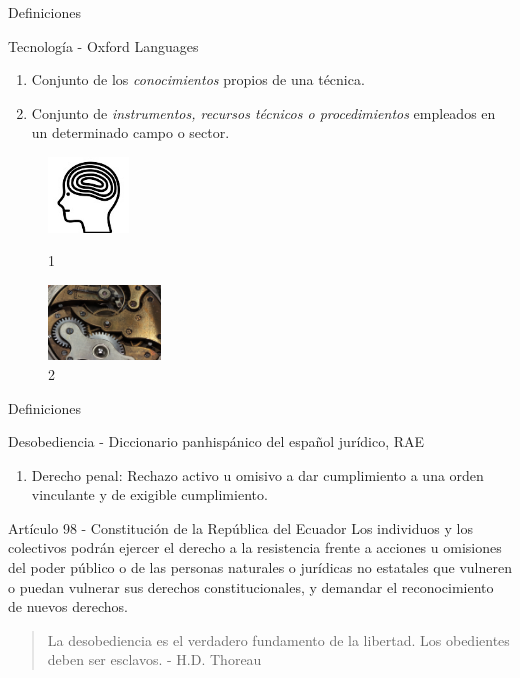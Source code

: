 \documentclass[spanish]{beamer}
\begin{document}
\begin{frame}{Definiciones}
    \begin{block}{Tecnología - Oxford Languages}
        \begin{enumerate}
            \item Conjunto de los \emph{conocimientos} propios de una técnica.
            \item Conjunto de \emph{instrumentos, recursos técnicos o procedimientos} empleados en un determinado campo o sector.
        \end{enumerate}                             
    \end{block}
    \begin{figure}[htb!]        
            \hspace*{1.5cm}\includegraphics[height=2cm]{img/mind.jpg}\caption{ 1}
        \endminipage\hfill
            \hspace*{1.5cm}\includegraphics[height=2cm]{img/clockwork.jpg}\caption{ 2}
        \endminipage\hfill
    \end{figure}
\end{frame}
\begin{frame}{Definiciones}
    \begin{block}{Desobediencia - Diccionario panhispánico del español jurídico, RAE}
        \begin{enumerate}
            \item Derecho penal: Rechazo activo u omisivo a dar cumplimiento a una orden vinculante y de exigible cumplimiento.
        \end{enumerate}
    \end{block}
    \begin{block}{Artículo 98 - Constitución de la República del Ecuador}
        Los individuos y los colectivos podrán ejercer el derecho a la resistencia frente a acciones u omisiones del poder público o de las personas naturales o jurídicas no estatales que vulneren o puedan vulnerar sus derechos constitucionales, y demandar el reconocimiento de nuevos derechos.
    \end{block}
\end{frame}
\begin{frame}{}
    \begin{quote}
        La desobediencia es el verdadero fundamento de la libertad. Los obedientes deben ser esclavos. - H.D. Thoreau
    \end{quote}
\end{frame}
\end{document}
